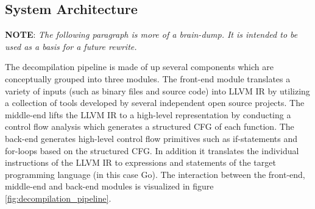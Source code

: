 



\subsection{System Architecture}




\textbf{NOTE}: \textit{The following paragraph is more of a brain-dump. It is intended to be used as a basis for a future rewrite.}

The decompilation pipeline is made of up several components which are conceptually grouped into three modules. The front-end module translates a variety of inputs (such as binary files and source code) into LLVM IR by utilizing a collection of tools developed by several independent open source projects. The middle-end lifts the LLVM IR to a high-level representation by conducting a control flow analysis which generates a structured CFG of each function. The back-end generates high-level control flow primitives such as if-statements and for-loops based on the structured CFG. In addition it translates the individual instructions of the LLVM IR to expressions and statements of the target programming language (in this case Go). The interaction between the front-end, middle-end and back-end modules is visualized in figure \ref{fig:decompilation_pipeline}.

